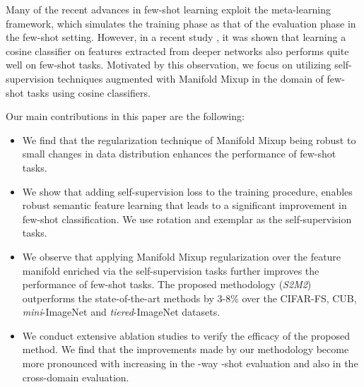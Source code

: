\documentclass[10pt,twocolumn,letterpaper]{article}
\begin{document}
Many of the recent advances in few-shot learning exploit the meta-learning framework, which simulates the training phase as that of the evaluation phase in the few-shot setting.
However, in a recent study \cite{chen2019closerfewshot}, it was shown that learning a cosine classifier on features extracted from deeper networks also performs quite well on few-shot tasks. Motivated by this observation, we focus on utilizing self-supervision techniques augmented with Manifold Mixup in the domain of few-shot tasks using cosine classifiers.





Our main contributions in this paper are the following: 
\begin{itemize}
    










    \item We find that the regularization technique of Manifold Mixup \cite{verma2019manifold} being robust to small changes in data distribution enhances the performance of few-shot tasks.
    
    \item We show that adding self-supervision loss to the training procedure, enables robust semantic feature learning that leads to a significant improvement in few-shot classification. We use rotation \cite{Spyros2018rotate} and exemplar \cite{exemplar2014} as the self-supervision tasks.

    \item We observe that applying Manifold Mixup regularization over the feature manifold enriched via the self-supervision tasks further improves the performance of few-shot tasks. The proposed methodology (\textit{S2M2}) outperforms the state-of-the-art methods by 3-8\% over the CIFAR-FS, CUB, \textit{mini}-ImageNet and {\textit{tiered}-ImageNet} datasets.
    
    \item We conduct extensive ablation studies to verify the efficacy of the proposed method. We find that the improvements made by our methodology become more pronounced with increasing  in the -way -shot evaluation and also
    in the cross-domain evaluation.
    
\end{itemize}
\end{document}
